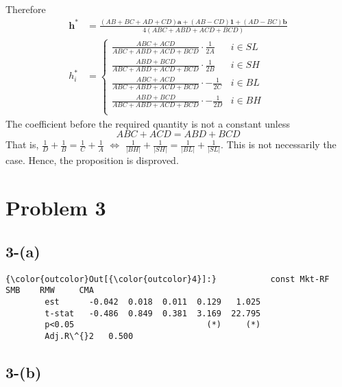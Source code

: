 \documentclass[11pt]{article}
\begin{document}
   Therefore
   \begin{equation}
     \begin{split}
       \bm{h}^* &= \frac{(AB+BC+AD+CD)\bm{a} + (AB-CD)\bm{1} + (AD-BC) \bm{b}}{4(ABC+ABD+ACD+BCD)} \\
       h_i^* &= \begin{cases}
       \frac{ABC + ACD}{ABC+ABD+ACD+BCD} \cdot \frac{1}{2A} & i\in SL \\
       \frac{ABD + BCD}{ABC+ABD+ACD+BCD} \cdot \frac{1}{2B} & i\in SH \\
       \frac{ABC + ACD}{ABC+ABD+ACD+BCD} \cdot -\frac{1}{2C} & i\in BL \\
       \frac{ABD + BCD}{ABC+ABD+ACD+BCD} \cdot -\frac{1}{2D} & i\in BH \\
       \end{cases}
     \end{split}
   \end{equation}
   The coefficient before the required quantity is not a constant unless
   \begin{equation}
     ABC + ACD = ABD + BCD
   \end{equation}
   That is, $\frac{1}{D} + \frac{1}{B} = \frac{1}{C} + \frac{1}{A}$ $\iff$ $\frac{1}{|BH|} + \frac{1}{|SH|} = \frac{1}{|BL|} + \frac{1}{|SL|}$. This is not necessarily the case. Hence, the proposition is disproved.

    


    \section*{Problem 3}\label{problem-3}

\subsection*{3-(a)}\label{a}


            \begin{Verbatim}[commandchars=\\\{\}]
{\color{outcolor}Out[{\color{outcolor}4}]:}           const Mkt-RF    SMB    RMW     CMA
        est      -0.042  0.018  0.011  0.129   1.025
        t-stat   -0.486  0.849  0.381  3.169  22.795
        p<0.05                           (*)     (*)
        Adj.R\^{}2   0.500                             
\end{Verbatim}
        
    \subsection*{3-(b)}\label{b}
\end{document}
